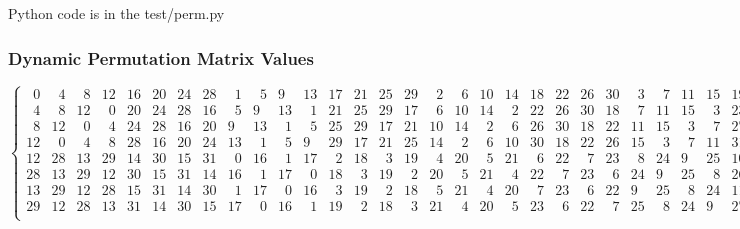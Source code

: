 \documentclass[fleqn, a4paper,12pt]{article}
\begin{document}
Python code is in the test/perm.py

 
\subsubsection{Dynamic Permutation Matrix Values} %

\renewcommand{\arraystretch}{1} %

\small
\[
\begin{Bmatrix}
\phantom{0}0 & \phantom{0}4 & \phantom{0}8 & 12 & 16 & 20 & 24 & 28 & \phantom{0}1 & \phantom{0}5 & 9 & 13 & 17 & 21 & 25 & 29 & \phantom{0}2 & \phantom{0}6 & 10 & 14 & 18 & 22 & 26 & 30 & \phantom{0}3 & \phantom{0}7 & 11 & 15 & 19 & 23 & 27 & 31 \\
\phantom{0}4 & \phantom{0}8 & 12 & \phantom{0}0 & 20 & 24 & 28 & 16 & \phantom{0}5 & 9 & 13 & \phantom{0}1 & 21 & 25 & 29 & 17 & \phantom{0}6 & 10 & 14 & \phantom{0}2 & 22 & 26 & 30 & 18 & \phantom{0}7 & 11 & 15 & \phantom{0}3 & 23 & 27 & 31 & 19 \\
\phantom{0}8 & 12 & \phantom{0}0 & \phantom{0}4 & 24 & 28 & 16 & 20 & 9 & 13 & \phantom{0}1 & \phantom{0}5 & 25 & 29 & 17 & 21 & 10 & 14 & \phantom{0}2 & \phantom{0}6 & 26 & 30 & 18 & 22 & 11 & 15 & \phantom{0}3 & \phantom{0}7 & 27 & 31 & 19 & 23 \\
12 & \phantom{0}0 & \phantom{0}4 & \phantom{0}8 & 28 & 16 & 20 & 24 & 13 & \phantom{0}1 & \phantom{0}5 & 9 & 29 & 17 & 21 & 25 & 14 & \phantom{0}2 & \phantom{0}6 & 10 & 30 & 18 & 22 & 26 & 15 & \phantom{0}3 & \phantom{0}7 & 11 & 31 & 19 & 23 & 27 \\
12 & 28 & 13 & 29 & 14 & 30 & 15 & 31 & \phantom{0}0 & 16 & \phantom{0}1 & 17 & \phantom{0}2 & 18 & \phantom{0}3 & 19 & \phantom{0}4 & 20 & \phantom{0}5 & 21 & \phantom{0}6 & 22 & \phantom{0}7 & 23 & \phantom{0}8 & 24 & 9 & 25 & 10 & 26 & 11 & 27 \\
28 & 13 & 29 & 12 & 30 & 15 & 31 & 14 & 16 & \phantom{0}1 & 17 & \phantom{0}0 & 18 & \phantom{0}3 & 19 & \phantom{0}2 & 20 & \phantom{0}5 & 21 & \phantom{0}4 & 22 & \phantom{0}7 & 23 & \phantom{0}6 & 24 & 9 & 25 & \phantom{0}8 & 26 & 11 & 27 & 10 \\
13 & 29 & 12 & 28 & 15 & 31 & 14 & 30 & \phantom{0}1 & 17 & \phantom{0}0 & 16 & \phantom{0}3 & 19 & \phantom{0}2 & 18 & \phantom{0}5 & 21 & \phantom{0}4 & 20 & \phantom{0}7 & 23 & \phantom{0}6 & 22 & 9 & 25 & \phantom{0}8 & 24 & 11 & 27 & 10 & 26 \\
29 & 12 & 28 & 13 & 31 & 14 & 30 & 15 & 17 & \phantom{0}0 & 16 & \phantom{0}1 & 19 & \phantom{0}2 & 18 & \phantom{0}3 & 21 & \phantom{0}4 & 20 & \phantom{0}5 & 23 & \phantom{0}6 & 22 & \phantom{0}7 & 25 & \phantom{0}8 & 24 & 9 & 27 & 10 & 26 & 11 \\

\end{Bmatrix}\]
\end{document}
